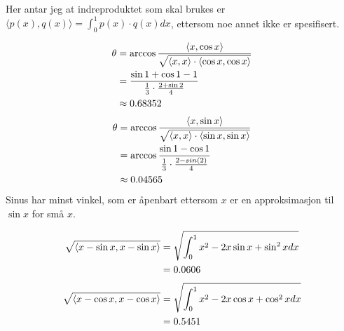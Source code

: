 \documentclass[11pt, a4paper, norsk]{NTNUoving}
\newenvironment{pkt}{\begin{punkt}}{\end{punkt}}
\newenvironment{indreprod}{
    \langle
}{
\rangle}
\begin{document}
\begin{oppgave}
    Her antar jeg at indreproduktet som skal brukes er $\langle p(x), q(x) \rangle=\int_0^1p(x)\cdot q(x)dx$, ettersom noe annet ikke er spesifisert. 
    \begin{pkt}
    \begin{align*}
                    \theta &= \arccos\frac{\langle x, \cos x \rangle}{\sqrt{\begin{indreprod}
            x, x
            \end{indreprod}\cdot \begin{indreprod}
            \cos x, \cos x
            \end{indreprod}}}
            \\&=\frac{\sin 1+\cos 1 -1}{\frac{1}{3}\cdot \frac{2+\sin 2}{4}}
            \\&\approx 0.68352
    \end{align*}
        \begin{align*}
            \theta &= \arccos\frac{\langle x, \sin x \rangle}{\sqrt{\begin{indreprod}
            x, x
            \end{indreprod}\cdot \begin{indreprod}
            \sin x, \sin x
            \end{indreprod}}}
            \\&= \arccos\frac{\sin 1-\cos 1}{\frac{1}{3}\cdot \frac{2-sin(2)}{4}}
            \\&\approx 0.04565
        \end{align*}
        Sinus har minst vinkel, som er åpenbart ettersom $x$ er en approksimasjon til $\sin x$ for små $x$.
    \end{pkt}
    \begin{pkt}
        \begin{align*}
            \sqrt{\begin{indreprod}
            x-\sin{x}, x-\sin x
            \end{indreprod}}
            &=\sqrt{\int_0^1x^2-2x\sin x+\sin^2xdx}
            \\&=0.0606
        \end{align*}
        \begin{align*}
            \sqrt{\begin{indreprod}
            x-\cos{x}, x-\cos x
            \end{indreprod}}
            &=\sqrt{\int_0^1x^2-2x\cos x+\cos^2xdx}
            \\&=0.5451

\end{align*}
\end{pkt}
\end{oppgave}
\end{document}
